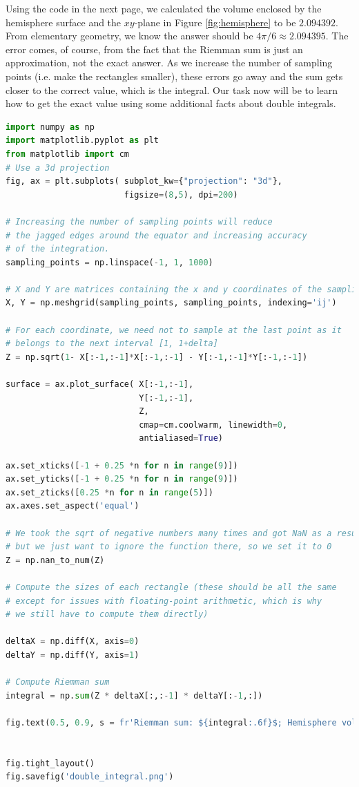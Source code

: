 Using the code in the next page, we calculated the volume enclosed by the hemisphere surface and the $xy$-plane in Figure \ref{fig:hemisphere} to be $2.094392$. From elementary geometry, we know the answer should be $4 \pi /6 \approx 2.094395$. The error comes, of course, from the fact that the Riemman sum is just an approximation, not the exact answer. As we increase the number of sampling points (i.e. make the rectangles smaller), these errors go away and the sum gets closer to the correct value, which is the integral. Our task now will be to learn how to get the exact value using some additional facts about double integrals.

\begin{lstlisting}[language=Python]
import numpy as np
import matplotlib.pyplot as plt
from matplotlib import cm
# Use a 3d projection
fig, ax = plt.subplots( subplot_kw={"projection": "3d"}, 
                        figsize=(8,5), dpi=200)

# Increasing the number of sampling points will reduce
# the jagged edges around the equator and increasing accuracy
# of the integration.
sampling_points = np.linspace(-1, 1, 1000)

# X and Y are matrices containing the x and y coordinates of the sampling points
X, Y = np.meshgrid(sampling_points, sampling_points, indexing='ij')

# For each coordinate, we need not to sample at the last point as it
# belongs to the next interval [1, 1+delta]
Z = np.sqrt(1- X[:-1,:-1]*X[:-1,:-1] - Y[:-1,:-1]*Y[:-1,:-1])

surface = ax.plot_surface( X[:-1,:-1], 
                           Y[:-1,:-1], 
                           Z,
                           cmap=cm.coolwarm, linewidth=0, 
                           antialiased=True)

ax.set_xticks([-1 + 0.25 *n for n in range(9)])
ax.set_yticks([-1 + 0.25 *n for n in range(9)])
ax.set_zticks([0.25 *n for n in range(5)])
ax.axes.set_aspect('equal')

# We took the sqrt of negative numbers many times and got NaN as a result,
# but we just want to ignore the function there, so we set it to 0
Z = np.nan_to_num(Z)

# Compute the sizes of each rectangle (these should be all the same
# except for issues with floating-point arithmetic, which is why
# we still have to compute them directly)

deltaX = np.diff(X, axis=0)
deltaY = np.diff(Y, axis=1)

# Compute Riemman sum
integral = np.sum(Z * deltaX[:,:-1] * deltaY[:-1,:])

fig.text(0.5, 0.9, s = fr'Riemman sum: ${integral:.6f}$; Hemisphere volume: $4\pi / 6 \approx {np.pi * 4/6:.6f}$', size=14, horizontalalignment='center')


fig.tight_layout()
fig.savefig('double_integral.png')
\end{lstlisting}

